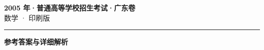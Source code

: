 \documentclass[zihao=5, a4paper]{ctexart}
\begin{document}
\begin{center}
  {\Large\bfseries 2005 年·普通高等学校招生考试·广东卷}\\[4pt]
  {\large 数学 · 印刷版}
\end{center}
\medskip
{}

\par\bigskip\hrule\bigskip
{}
\begin{center}{\large\bfseries 参考答案与详细解析}\end{center}
\smallskip

\end{document}
